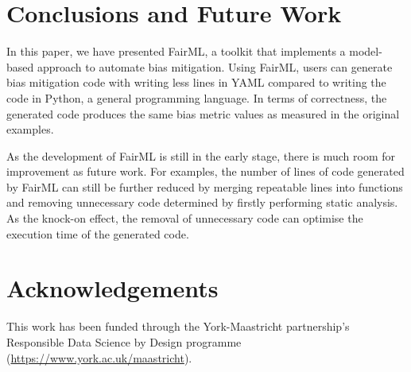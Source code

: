 \documentclass[sigconf,review]{acmart}
\begin{document}
\section{Conclusions and Future Work}
\label{sec:conclusions_and_future_work}
In this paper, we have presented FairML, a toolkit that implements a model-based approach to automate bias mitigation. Using FairML, users can generate bias mitigation code with writing less lines in YAML compared to writing the code in Python, a general programming language.
In terms of correctness, the generated code produces the same bias metric values as measured in the original examples.

As the development of FairML is still in the early stage, 
there is much room for improvement as future work. For examples, the number of lines of code generated by FairML can still be further reduced by merging repeatable lines into functions and removing unnecessary code determined by firstly performing static analysis. 
As the knock-on effect, the removal of unnecessary code can optimise the execution time of the generated code. 


\section{Acknowledgements}
\label{sec:acknowledgements}
This work has been funded through the York-Maastricht
partnership’s Responsible Data Science by Design programme
(\url{https://www.york.ac.uk/maastricht}).

%
%

 

\end{document}
